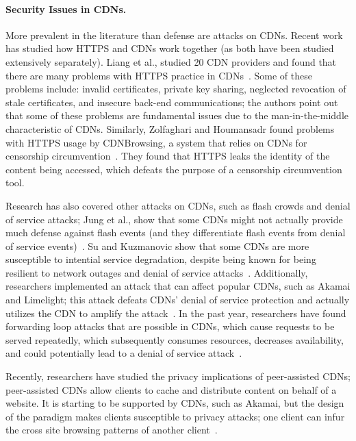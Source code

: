 \paragraph{Security Issues in CDNs.} More prevalent in the literature than defense are attacks on CDNs.  Recent work 
has studied how HTTPS and CDNs work together (as both have been studied extensively separately).  Liang et al., studied 
20 CDN providers and found that there are many problems with HTTPS practice in CDNs~\cite{liang2014https}.  Some of these 
problems include: invalid certificates, private key sharing, neglected revocation of stale certificates, and 
insecure back-end communications; the authors point out that some of these problems are fundamental issues due to 
the man-in-the-middle characteristic of CDNs.  Similarly, Zolfaghari and Houmansadr found problems with HTTPS usage by 
CDNBrowsing, a system that relies on CDNs for censorship circumvention~\cite{zolfaghari2016practical}.  They found that HTTPS 
leaks the identity of the content being accessed, which defeats the purpose of a censorship circumvention tool. 

Research has also covered other attacks on CDNs, such as flash crowds and denial of service attacks; Jung et al., show 
that some CDNs might not actually provide much defense against flash events (and they differentiate flash events from denial 
of service events)~\cite{jung2002flash}. Su and Kuzmanovic show that some CDNs are more susceptible to intential service 
degradation, despite being known for being resilient to network outages and denial of service attacks~\cite{su2008thinning}. 
Additionally, researchers implemented an attack that can affect popular CDNs, such as Akamai and Limelight; this attack 
defeats CDNs' denial of service protection and actually utilizes the CDN to amplify the attack~\cite{triukose2009content}.  In the 
past year, researchers have found forwarding loop attacks that are possible in CDNs, which cause requests to be served repeatedly, which 
subsequently consumes resources, decreases availability, and could potentially lead to a denial of service attack~\cite{chen2016forwarding}.

Recently, researchers have studied the privacy implications of peer-assisted CDNs; peer-assisted CDNs allow clients to cache and distribute 
content on behalf of a website.  It is starting to be supported by CDNs, such as Akamai, but the design of the paradigm
makes clients susceptible to privacy attacks; one client can infur the cross site browsing patterns of another client~\cite{jia2016anonymity}.\\

